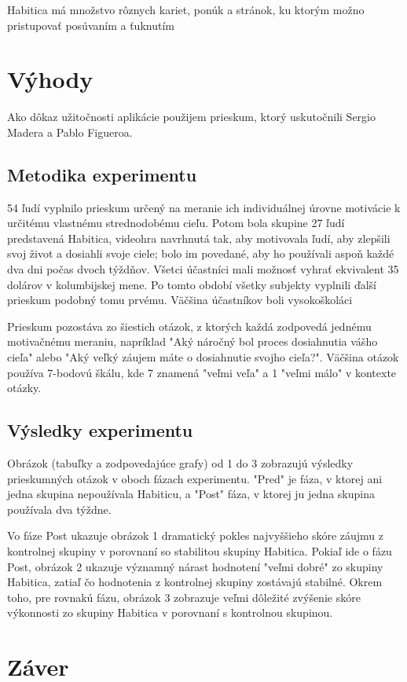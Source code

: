 \documentclass[10pt,twoside,slovak,a4paper]{article}
\begin{document}
Habitica má množstvo rôznych kariet, ponúk a stránok, ku ktorým možno pristupovať posúvaním a ťuknutím

\section{Výhody} \label{benefits}
Ako dôkaz užitočnosti aplikácie použijem prieskum, ktorý uskutočnili Sergio Madera a Pablo Figueroa.\cite{StudyOnPotentialOfVideogames}

\subsection{Metodika experimentu} \label{benefits:methodology}
54 ľudí vyplnilo prieskum určený na meranie ich individuálnej úrovne motivácie k určitému vlastnému strednodobému cieľu. 
Potom bola skupine 27 ľudí predstavená Habitica, videohra navrhnutá tak, aby motivovala ľudí, aby zlepšili svoj život a 
dosiahli svoje ciele; bolo im povedané, aby ho používali aspoň každé dva dni počas dvoch týždňov. 
Všetci účastníci mali možnosť vyhrať ekvivalent 35 dolárov v kolumbijskej mene. Po tomto období 
všetky subjekty vyplnili ďalší prieskum podobný tomu prvému. Väčšina účastníkov boli vysokoškoláci\cite{StudyOnPotentialOfVideogames}

Prieskum pozostáva zo šiestich otázok, z ktorých každá zodpovedá jednému motivačnému meraniu, napríklad 
"Aký náročný bol proces dosiahnutia vášho cieľa" alebo "Aký veľký záujem máte o dosiahnutie svojho cieľa?". 
Väčšina otázok používa 7-bodovú škálu, kde 7 znamená "veľmi veľa" a 1 "veľmi málo" v kontexte otázky.\cite{StudyOnPotentialOfVideogames}

\subsection{Výsledky experimentu} \label{benefits:results}
Obrázok (tabuľky a zodpovedajúce grafy) od 1 do 3 zobrazujú výsledky prieskumných otázok v oboch fázach experimentu. 
"Pred" je fáza, v ktorej ani jedna skupina nepoužívala Habiticu, a 
"Post" fáza, v ktorej ju jedna skupina používala dva týždne.

Vo fáze Post ukazuje obrázok 1 dramatický pokles najvyššieho skóre 
záujmu z kontrolnej skupiny v porovnaní so stabilitou skupiny Habitica.
Pokiaľ ide o fázu Post, obrázok 2 ukazuje významný nárast hodnotení "veľmi dobré" 
zo skupiny Habitica, zatiaľ čo hodnotenia z kontrolnej skupiny zostávajú stabilné. 
Okrem toho, pre rovnakú fázu, obrázok 3 zobrazuje veľmi dôležité zvýšenie skóre 
výkonnosti zo skupiny Habitica v porovnaní s kontrolnou skupinou.\cite{StudyOnPotentialOfVideogames}
\section{Záver} \label{conclusion}


\end{document}

